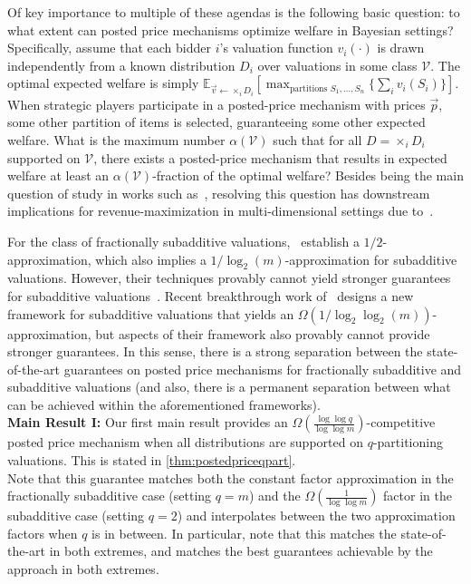 \documentclass[11pt]{article}%
\numberwithin{theorem}{subsection}
\begin{document}
Of key importance to multiple of these agendas is the following basic question: to what extent can posted price mechanisms optimize welfare in Bayesian settings? Specifically, assume that each bidder $i$'s valuation function $v_i(\cdot)$ is drawn independently from a known distribution $D_i$ over valuations in some class $\mathcal{V}$. The optimal expected welfare is simply $\mathbb{E}_{\vec{v}\leftarrow \times_i D_i}[\max_{\text{partitions } S_1,\ldots, S_n}\{\sum_i v_i(S_i)\}]$. When strategic players participate in a posted-price mechanism with prices $\vec{p}$, some other partition of items is selected, guaranteeing some other expected welfare. What is the maximum number $\alpha(\mathcal{V})$ such that for all $D = \times_i D_i$ supported on $\mathcal{V}$, there exists a posted-price mechanism that results in expected welfare at least an $\alpha(\mathcal{V})$-fraction of the optimal welfare? Besides being the main question of study in works such as~\cite{FeldmanGL15,DuttingFKL20,DuttingKL20}, resolving this question has downstream implications for revenue-maximization in multi-dimensional settings due to~\cite{CaiZ17}. 

For the class of fractionally subadditive valuations,~\cite{FeldmanGL15} establish a $1/2$-approximation, which also implies a $1/\log_2(m)$-approximation for subadditive valuations. However, their techniques provably cannot yield stronger guarantees for subadditive valuations~\cite{BhawalkarR11,DuttingFKL20}. Recent breakthrough work of~\cite{DuttingKL20} designs a new framework for subadditive valuations that yields an $\Omega(1/\log_2\log_2(m))$-approximation, but aspects of their framework also provably cannot provide stronger guarantees. In this sense, there is a strong separation between the state-of-the-art guarantees on posted price mechanisms for fractionally subadditive and subadditive valuations (and also, there is a permanent separation between what can be achieved within the aforementioned frameworks).\\

\noindent\textbf{Main Result I:} Our first main result provides an $\Omega(\frac{\log \log q}{\log \log m})$-competitive posted price mechanism when all distributions are supported on $q$-partitioning valuations. This is stated in \cref{thm:postedpriceqpart}.\\

\noindent Note that this guarantee matches both the constant factor approximation in the fractionally subadditive case (setting $q = m$) and the $\Omega(\frac{1}{\log \log m})$ factor in the subadditive case (setting $q = 2$) and interpolates between the two approximation factors when $q$ is in between. In particular, note that this matches the state-of-the-art in both extremes, and matches the best guarantees achievable by the~\cite{DuttingKL20} approach in both extremes.\\
\end{document}
